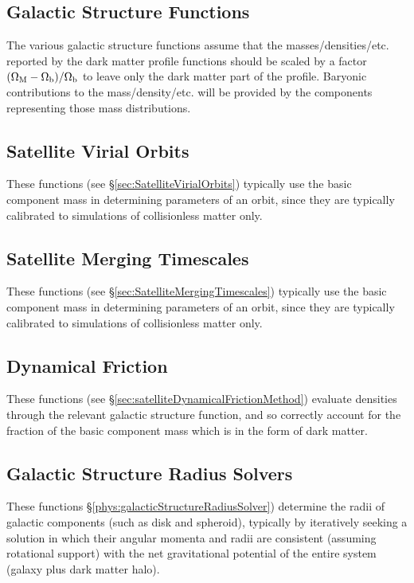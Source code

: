 \subsection{Galactic Structure Functions}

The various galactic structure functions assume that the masses/densities/etc. reported by the dark matter profile functions should be scaled by a factor $(\Omega_{\rm M}-\Omega_{\rm b})/\Omega_{\rm b}$ to leave only the dark matter part of the profile. Baryonic contributions to the mass/density/etc. will be provided by the components representing those mass distributions.

\subsection{Satellite Virial Orbits}

These functions (see \S\ref{sec:SatelliteVirialOrbits}) typically use the {\normalfont \ttfamily basic} component mass in determining parameters of an orbit, since they are typically calibrated to simulations of collisionless matter only.

\subsection{Satellite Merging Timescales}

These functions (see \S\ref{sec:SatelliteMergingTimescales}) typically use the {\normalfont \ttfamily basic} component mass in determining parameters of an orbit, since they are typically calibrated to simulations of collisionless matter only.

\subsection{Dynamical Friction}

These functions (see \S\ref{sec:satelliteDynamicalFrictionMethod}) evaluate densities through the relevant galactic structure function, and so correctly account for the fraction of the {\normalfont \ttfamily basic} component mass which is in the form of dark matter.

\subsection{Galactic Structure Radius Solvers}

These functions \S\ref{phys:galacticStructureRadiusSolver}) determine the radii of galactic components (such as disk and spheroid), typically by iteratively seeking a solution in which their angular momenta and radii are consistent (assuming rotational support) with the net gravitational potential of the entire system (galaxy plus dark matter halo).

